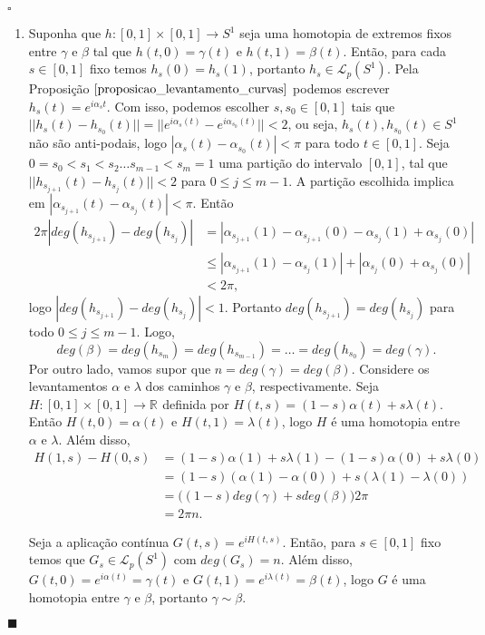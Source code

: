 \documentclass[12pt]{book}
\newenvironment{prova}[1]{$\square$ #1}{\hfill$\blacksquare$}
\newcommand{\caminhos}{\mathcal{L}}
\newcommand{\caminhospontobasegeral}[2]{\caminhos_{#1}(#2)}
\newcommand{\circulo}{S^{1}}
\newcommand{\norma}[1]{||#1||}
\newcommand{\real}[1]{\mathbb{R}^{#1}}
\begin{document}
\begin{prova}
\begin{enumerate}
			\item Suponha que $h:[0,1]\times [0,1]\to S^{1}$ seja uma homotopia de extremos fixos entre $\gamma$ e $\beta$ tal que $h(t,0) = \gamma(t)$ e $h(t,1) = \beta(t)$. Então, para cada $s \in [0,1]$ fixo temos $h_{s}(0) = h_{s}(1)$, portanto $h_{s} \in \caminhospontobasegeral{p}{\circulo}$. Pela Proposição $\ref{proposicao_levantamento_curvas}$ podemos escrever $h_{s}(t) = e^{i\alpha_{s}t}$. Com isso, podemos escolher $s, s_{0 }\in [0,1]$ tais que $\norma{h_{s}(t)-h_{s_{0}}(t)} =\norma{e^{i\alpha_{s}(t)} - e^{i\alpha_{s_{0}}(t)}} <2$, ou seja, $h_{s}(t), h_{s_{0}}(t) \in \circulo$ não são anti-podais, logo $|\alpha_{s}(t)-\alpha_{s_{0}}(t)| <\pi$ para todo $t\in [0,1]$. Seja $0=s_{0}<s_{1}<s_{2}\dots s_{m-1}<s_{m} = 1$ uma partição do intervalo $[0,1]$, tal que $\norma{h_{s_{j+1}}(t)-h_{s_{j}}(t)}<2$ para $0\leq j \leq m-1$. A partição escolhida implica em $|\alpha_{s_{j+1}}(t)-\alpha_{s_{j}}(t)| <\pi$. Então
			$$
			\begin{aligned}
			2\pi|deg(h_{s_{j+1}})-deg(h_{s_{j}})| 
			&= |\alpha_{s_{j+1}}(1)-\alpha_{s_{j+1}}(0) - \alpha_{s_{j}}(1)+\alpha_{s_{j}}(0)|
			\\
			&\leq |\alpha_{s_{j+1}}(1)-\alpha_{s_{j}}(1)| + |\alpha_{s_{j}}(0)+\alpha_{s_{j}}(0)|
			\\
			&<2\pi,
			\end{aligned} 
			$$
			logo $|deg(h_{s_{j+1}})-deg(h_{s_{j}})| <1$. Portanto $deg(h_{s_{j+1}})=deg(h_{s_{j}})$ para todo $0\leq j \leq m-1$. Logo, 
			$$
			deg(\beta) = deg(h_{s_{m}})=deg(h_{s_{m-1}})=\dots=deg(h_{s_{0}}) = deg(\gamma).
			$$
			Por outro lado, vamos supor que $n = deg(\gamma)=deg(\beta)$. Considere os levantamentos $\alpha$ e $\lambda$ dos caminhos $\gamma$ e $\beta$, respectivamente. Seja $H:[0,1]\times [0,1] \to \real{}$ definida por $H(t,s) = (1-s)\alpha(t) + s\lambda(t)$. Então $H(t,0)=\alpha(t)$ e $H(t,1)=\lambda(t)$, logo $H$ é uma homotopia entre $\alpha$ e $\lambda$. Além disso, 
			$$
			\begin{aligned}
			H(1,s) - H(0,s) 
			&= (1-s)\alpha(1) + s\lambda(1) - (1-s)\alpha(0) + s\lambda(0) 
			\\
			&= (1-s)(\alpha(1)-\alpha(0)) + s(\lambda(1)-\lambda(0))
			\\
			&=\big( (1-s)deg(\gamma) +sdeg(\beta)\big)2\pi
			\\
			&= 2\pi n.
			\end{aligned}
			$$ 
			
			Seja a aplicação contínua $G(t, s) = e^{iH(t,s)}$. Então, para $s \in [0,1]$ fixo temos que $G_{s} \in \caminhospontobasegeral{p}{\circulo}$ com $deg(G_{s}) = n$. Além disso, $G(t,0) = e^{i\alpha(t)} = \gamma(t)$ e $G(t,1) = e^{i\lambda(t)} = \beta(t)$, logo $G$ é uma homotopia entre $\gamma$ e $\beta$, portanto $\gamma \sim \beta$.
			

\end{enumerate}
\end{prova}
\end{document}
